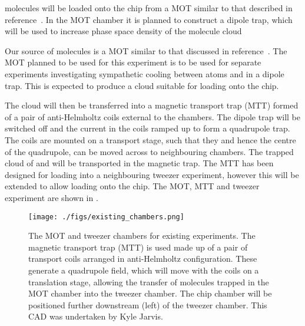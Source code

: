 
\CaF{} molecules will be loaded onto the chip from a MOT similar to
that described in reference~\cite{Truppe2017}. In the MOT chamber it is planned
to construct a dipole trap, which will be used to increase phase space density
of the molecule cloud


Our source of \CaF{} molecules is a MOT similar to that discussed in
reference~\cite{Truppe2017}. The MOT planned to be used for this experiment is
to be used for separate experiments investigating sympathetic cooling between
\esRb{} atoms and \CaF{} in a dipole trap. This is expected to produce a \CaF{}
cloud suitable for loading onto the chip.

The cloud will then be transferred into a magnetic transport trap (MTT) formed of
a pair of anti-Helmholtz coils external to the chambers. The dipole trap will be
switched off and the current in the coils ramped up to form a quadrupole trap.
The coils are mounted on a transport stage, such that they and hence the centre
of the quadrupole, can be moved across to neighbouring chambers. The trapped
cloud of \CaF{} and \esRb{} will be transported in the magnetic trap.
The MTT has been designed for loading into a neighbouring tweezer experiment,
however this will be extended to allow loading onto the chip. The MOT, MTT and
tweezer experiment are shown in . 

\begin{figure}[ht]
  \texttt{[image: ./figs/existing\_chambers.png]}
  \caption{
    The MOT and tweezer chambers for existing experiments. The magnetic
    transport trap (MTT) is used made up of a pair of transport coils arranged
    in anti-Helmholtz configuration. These generate a quadrupole field, which
    will move with the coils on a translation stage, allowing the transfer of
    molecules trapped in the MOT chamber into the tweezer chamber. The chip
    chamber will be positioned further downstream (left) of the tweezer chamber.
    This CAD was undertaken by Kyle Jarvis.
  }
  \label{experiment:fig:MTTsetup}
\end{figure}

